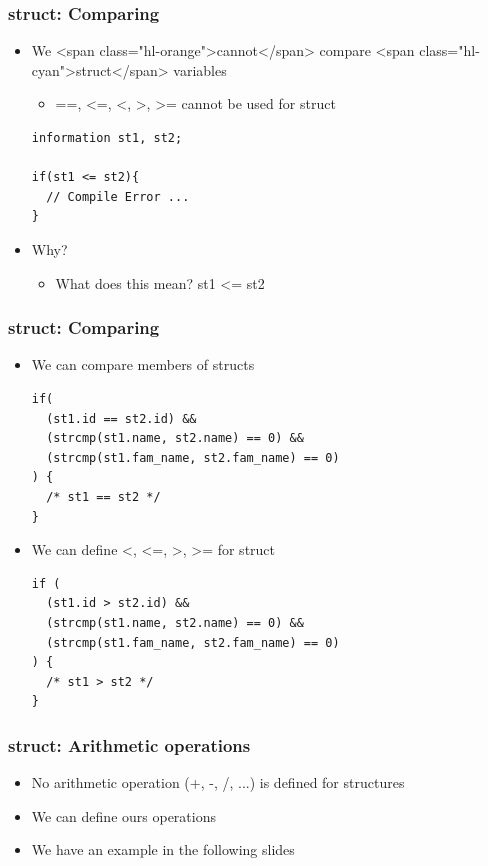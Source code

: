 \documentclass{../c-lecture}
\begin{document}
\begin{frame}[fragile]
  \frametitle{struct: Comparing}
  \begin{itemize}
    \item
      We <span class="hl-orange">cannot</span> compare
      <span class="hl-cyan">struct</span> variables

    \begin{itemize}
      \item ==, <=, <, >, >= cannot be used for struct
    \end{itemize}
    \begin{verbatim}
information st1, st2;

if(st1 <= st2){
  // Compile Error ...
}

    \end{verbatim}
    \item Why?
    \begin{itemize}
      \item What does this mean? st1 <= st2
    \end{itemize}
  \end{itemize}
\end{frame}

\begin{frame}[fragile]
  \frametitle{struct: Comparing}
  \begin{itemize}
    \item We can compare members of structs
    \begin{verbatim}
if(
  (st1.id == st2.id) &&
  (strcmp(st1.name, st2.name) == 0) &&
  (strcmp(st1.fam_name, st2.fam_name) == 0)
) {
  /* st1 == st2 */
}
    \end{verbatim}
    \item We can define <, <=, >, >= for struct
    \begin{verbatim}
if (
  (st1.id > st2.id) &&
  (strcmp(st1.name, st2.name) == 0) &&
  (strcmp(st1.fam_name, st2.fam_name) == 0)
) {
  /* st1 > st2 */
}
    \end{verbatim}
  \end{itemize}
\end{frame}
\begin{frame}
  \frametitle{struct: Arithmetic operations}
  \begin{itemize}
    \item No arithmetic operation (+, -, /, ...) is defined for structures
    \item We can define ours operations
    \item We have an example in the following slides
  \end{itemize}
\end{frame}
\end{document}
